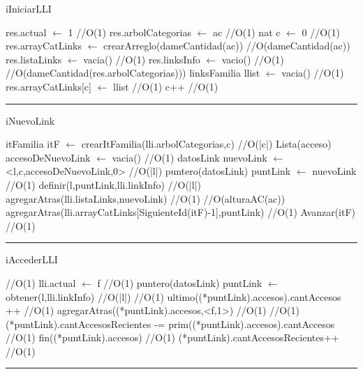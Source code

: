 \begin{algorithm}[H]
\caption{iIniciarLLI}
\begin{algorithmic}[1]
\state res.actual $\gets$ 1 \hfill//O(1)
\state res.arbolCategorias $\gets$ ac \hfill //O(1)
\state nat c $\gets$ 0 \hfill //O(1)
\state res.arrayCatLinks $\gets$ crearArreglo(dameCantidad(ac)) 
\state\hfill //O(dameCantidad(ac))
\state res.listaLinks $\gets$ vacia() \hfill //O(1)
\state res.linksInfo $\gets$ vacio() \hfill //O(1)
\state\hfill //O(dameCantidad(res.arbolCategorias)))
\state linksFamilia llist $\gets$ vacia() \hfill //O(1)
\state res.arrayCatLinks[c] $\gets$ llist \hfill //O(1)
\state c++ \hfill //O(1)
\endwhile
\EndFunction 
\end{algorithmic}
\hrule
{}
\end{algorithm}

\begin{algorithm}[H]
\caption{iNuevoLink}
\begin{algorithmic}[1]
\state itFamilia itF $\gets$ crearItFamilia(lli.arbolCategorias,c) \hfill//O(|c|)
\state Lista(acceso) accesoDeNuevoLink $\gets$ vacia() \hfill //O(1)
\state datosLink nuevoLink $\gets$ <l,c,accesoDeNuevoLink,0> \hfill //O(|l|)
\state puntero(datosLink) puntLink $\gets$ nuevoLink \hfill //O(1)
\state definir(l,puntLink,lli.linkInfo) \hfill //O(|l|)
\state agregarAtras(lli.listaLinks,nuevoLink) \hfill //O(1)
 \hfill //O(alturaAC(ac))
\state agregarAtras(lli.arrayCatLinks[SiguienteId(itF)-1],puntLink) \hfill //O(1)
\state Avanzar(itF) \hfill //O(1)
\endwhile
\EndFunction 
\end{algorithmic}
\hrule
{}
\end{algorithm}

\begin{algorithm}[H]
\caption{iAccederLLI}
\begin{algorithmic}[1]
 \hfill//O(1)
\state lli.actual $\gets$ f \hfill //O(1)
\endif
\state puntero(datosLink) puntLink $\gets$ obtener(l,lli.linkInfo) \hfill//O(|l|)
 \hfill//O(1)
\state ultimo((*puntLink).accesos).cantAccesos ++ \hfill //O(1)
\Else
\state agregarAtras((*puntLink).accesos,<f,1>) \hfill //O(1)
\endif
{} \hfill //O(1)
\state (*puntLink).cantAccesosRecientes -= prim((*puntLink).accesos).cantAccesos \hfill //O(1)
\state fin((*puntLink).accesos) \hfill //O(1)
\endif
\state (*puntLink).cantAccesosRecientes++ \hfill //O(1)
\EndFunction 
\end{algorithmic}
\hrule
{}
\end{algorithm}

